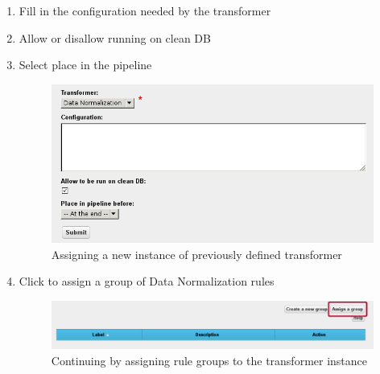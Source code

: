 {\begin{enumerate}[resume]
	\emph{If there is no option then go back to the} \textbf{} \emph{section}
	
	To be able to assign rule groups select one of the standard transformers (QualityAssessor, DataNormalizer, Linker)

	\item Fill in the configuration needed by the transformer
	\item Allow or disallow running on clean DB
	\item Select place in the pipeline

\begin{figure}[!ht]
    \centering
    \includegraphics[width=\textwidth]{images/fe-walkthrough-new-transformer-assignment.png}
    \caption{Assigning a new instance of previously defined transformer}
	\label{fig:feWTNewTransformerAssignment}
\end{figure}
\FloatBarrier

\newpage
\vspace*{0.2\textheight}

	\item Click  to assign a group of Data Normalization rules

\begin{figure}[!ht]
    \centering
    \includegraphics[width=\textwidth]{images/fe-walkthrough-assign-group.png}
    \caption{Continuing by assigning rule groups to the transformer instance}
	\label{fig:feWTAssignGroup}
\end{figure}
\FloatBarrier

\vspace*{0.2\textheight}


\end{enumerate}}
